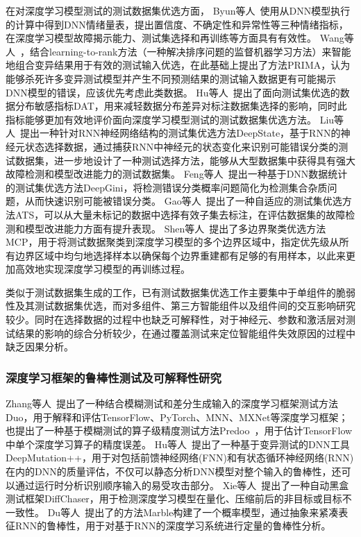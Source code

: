 在对深度学习模型测试的测试数据集优选方面，
Byun等人~使用从DNN模型执行的计算中得到DNN情绪量表，提出置信度、不确定性和异常性等三种情绪指标，在深度学习模型故障揭示能力、测试集选择和再训练等方面具有有效性。
Wang等人~，结合learning-to-rank方法（一种解决排序问题的监督机器学习方法）来智能地组合变异结果用于有效的测试输入优选，在此基础上提出了方法PRIMA，认为能够杀死许多变异测试模型并产生不同预测结果的测试输入数据更有可能揭示DNN模型的错误，应该优先考虑此类数据。
Hu等人~提出了面向测试集优选的数据分布敏感指标DAT，用来减轻数据分布差异对标注数据集选择的影响，同时此指标能够更加有效地评价面向深度学习模型测试的测试数据集优选方法。
Liu等人~提出一种针对RNN神经网络结构的测试集优选方法DeepState，基于RNN的神经元状态选择数据，通过捕获RNN中神经元的状态变化来识别可能错误分类的测试数据集，进一步地设计了一种测试选择方法，能够从大型数据集中获得具有强大故障检测和模型改进能力的测试数据集。
Feng等人~提出一种基于DNN数据统计的测试集优选方法DeepGini，将检测错误分类概率问题简化为检测集合杂质问题，从而快速识别可能被错误分类。
Gao等人~提出了一种自适应的测试集优选方法ATS，可以从大量未标记的数据中选择有效子集去标注，在评估数据集的故障检测和模型改进能力方面有提升表现。
Shen等人~提出了多边界聚类优选方法MCP，用于将测试数据聚类到深度学习模型的多个边界区域中，指定优先级从所有边界区域中均匀地选择样本以确保每个边界重建都有足够的有用样本，以此来更加高效地实现深度学习模型的再训练过程。

类似于测试数据集生成的工作，已有测试数据集优选工作主要集中于单组件的脆弱性及其测试数据集优选，而对多组件、第三方智能组件以及组件间的交互影响研究较少。同时在选择数据的过程中也缺乏可解释性，对于神经元、参数和激活层对测试结果的影响的综合分析较少，在通过覆盖测试来定位智能组件失效原因的过程中缺乏因果分析。



\subsubsection{深度学习框架的鲁棒性测试及可解释性研究}

Zhang等人~提出了一种结合模糊测试和差分生成输入的深度学习框架测试方法Duo，用于解释和评估TensorFlow、PyTorch、MNN、MXNet等深度学习框架；也提出了一种基于模糊测试的算子级精度测试方法Predoo~，用于估计TensorFlow中单个深度学习算子的精度误差。
Hu等人~提出了一种基于变异测试的DNN工具DeepMutation++，用于对包括前馈神经网络(FNN)和有状态循环神经网络(RNN)在内的DNN的质量评估，不仅可以静态分析DNN模型对整个输入的鲁棒性，还可以通过运行时分析识别顺序输入的易受攻击部分。
Xie等人~提出了一种自动黑盒测试框架DiffChaser，用于检测深度学习模型在量化、压缩前后的非目标或目标不一致性。
Du等人~提出了的方法Marble构建了一个概率模型，通过抽象来紧凑表征RNN的鲁棒性，用于对基于RNN的深度学习系统进行定量的鲁棒性分析。

